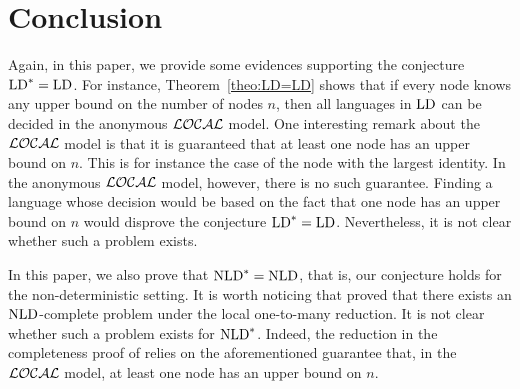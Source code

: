 \documentclass{llncs}
\newcommand{\local}{{\cal LOCAL}}
\newcommand{\LD}{\mbox{\rm LD}}
\newcommand{\NLD}{\mbox{\rm NLD}}
\begin{document}
\section{Conclusion}


Again, in this paper, we provide some evidences supporting the conjecture $\LD^*=\LD$. For instance, Theorem~\ref{theo:LD=LD} shows that if every node knows any upper bound on the number of nodes $n$, then all languages in $\LD$ can be decided in the anonymous $\local$ model. One interesting remark about the $\local$ model is that it is guaranteed that at least one node has an upper bound on $n$. This is for instance the case of the node with the largest identity. In the anonymous $\local$ model, however, there is no such guarantee. Finding a language whose decision would be based on the fact that one node has an upper bound on $n$ would disprove the conjecture  $\LD^*=\LD$. Nevertheless, it is not clear whether such a problem exists. 

In this paper, we also prove that $\NLD^*=\NLD$, that is, our conjecture holds for the non-deterministic setting. It is worth noticing that \cite{FKP11} proved that there exists an $\NLD$-complete problem under the local one-to-many reduction. It is not clear whether such a problem exists for $\NLD^*$. Indeed, the reduction in the completeness proof of \cite{FKP11} relies on the aforementioned guarantee that, in the $\local$ model,  at least one node has an upper bound on $n$. 
\end{document}

